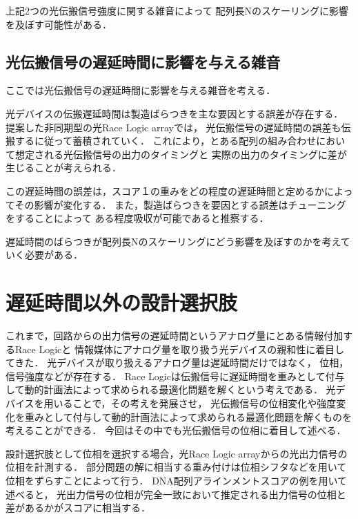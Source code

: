 上記2つの光伝搬信号強度に関する雑音によって
配列長Nのスケーリングに影響を及ぼす可能性がある．

\subsection{光伝搬信号の遅延時間に影響を与える雑音}
ここでは光伝搬信号の遅延時間に影響を与える雑音を考える．

光デバイスの伝搬遅延時間は製造ばらつきを主な要因とする誤差が存在する．
提案した非同期型の光Race Logic arrayでは，
光伝搬信号の遅延時間の誤差も伝搬するに従って蓄積されていく．
これにより，とある配列の組み合わせにおいて想定される光伝搬信号の出力のタイミングと
実際の出力のタイミングに差が生じることが考えられる．

この遅延時間の誤差は，スコア１の重みをどの程度の遅延時間と定めるかによってその影響が変化する．
また，製造ばらつきを要因とする誤差はチューニングをすることによって
ある程度吸収が可能であると推察する．

遅延時間のばらつきが配列長Nのスケーリングにどう影響を及ぼすのかを考えていく必要がある．

\section{遅延時間以外の設計選択肢}
これまで，回路からの出力信号の遅延時間というアナログ量にとある情報付加するRace Logicと
情報媒体にアナログ量を取り扱う光デバイスの親和性に着目してきた．
光デバイスが取り扱えるアナログ量は遅延時間だけではなく，
位相，信号強度などが存在する．
Race Logicは伝搬信号に遅延時間を重みとして付与して動的計画法によって求められる最適化問題を解くという考えである．
光デバイスを用いることで，その考えを発展させ，
光伝搬信号の位相変化や強度変化を重みとして付与して動的計画法によって求められる最適化問題を解くものを
考えることができる．
今回はその中でも光伝搬信号の位相に着目して述べる．

設計選択肢として位相を選択する場合，光Race Logic arrayからの光出力信号の
位相を計測する．
部分問題の解に相当する重み付けは位相シフタなどを用いて位相をずらすことによって行う．
DNA配列アラインメントスコアの例を用いて述べると，
光出力信号の位相が完全一致において推定される出力信号の位相と差があるかがスコアに相当する．

